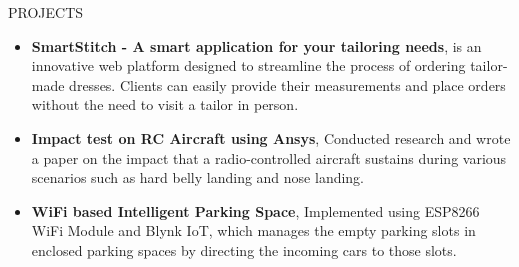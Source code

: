 \documentclass{resume} %
\begin{document}
\begin{rSection}{PROJECTS}
\begin{itemize}


\item \textbf{SmartStitch - A smart application for your tailoring needs}{, is an innovative web platform designed to streamline the process of ordering tailor-made dresses. Clients can easily provide their measurements and place orders without the need to visit a tailor in person.}
\item \textbf{Impact test on RC Aircraft using Ansys}{, Conducted research and wrote a paper on the impact that a radio-controlled aircraft sustains during
various scenarios such as hard belly landing and nose landing.}

\item \textbf{WiFi based Intelligent Parking Space}{, Implemented using ESP8266 WiFi Module and Blynk IoT, which manages the empty parking slots in enclosed parking spaces by directing the incoming cars to those slots.}
\end{itemize}

\end{rSection}
\end{document}
